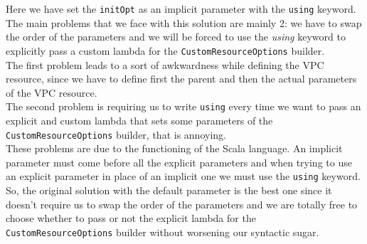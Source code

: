 Here we have set the \texttt{initOpt} as an implicit parameter with the \texttt{using} keyword.
The main problems that we face with this solution are mainly 2: we have to swap the order of the parameters and we will be forced to use the \textit{using} keyword to explicitly pass a custom lambda for the \texttt{CustomResourceOptions} builder.\\
The first problem leads to a sort of awkwardness while defining the VPC resource, since we have to define first the parent and then the actual parameters of the VPC resource.\\
The second problem is requiring us to write \texttt{using} every time we want to pass an explicit and custom lambda that sets some parameters of the \texttt{CustomResourceOptions} builder, that is annoying.\\
These problems are due to the functioning of the Scala language.
An implicit parameter must come before all the explicit parameters and when trying to use an explicit parameter in place of an implicit one we must use the \texttt{using} keyword.
So, the original solution with the default parameter is the best one since it doesn't require us to swap the order of the parameters and we are totally free to choose whether to pass or not the explicit lambda for the \texttt{CustomResourceOptions} builder without worsening our syntactic sugar.


